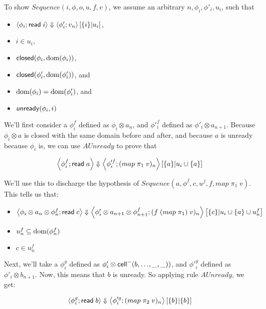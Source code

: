 \documentclass{article}
\begin{document}
To show $Sequence(i, \phi, o, u, f, v)$, we assume an arbitrary $n,
\phi_i, \phi'_i, u_i$, such that

\begin{itemize}
\item $\left<{\phi_i};{\mbox{\textsf{{read}}}\; i}\right>\Downarrow\left<{\phi'_i};{v_n}\right>\left[{\{{i}\}}|{u_i}\right]$, 
\item $i \in u_i$, 
\item $\mbox{\textsf{{closed}}}({\phi_i}, {\mbox{dom}({\phi_i})})$,
\item $\mbox{\textsf{{closed}}}({\phi'_i}, {\mbox{dom}({\phi'_i})})$, and
\item $\mbox{dom}({\phi_i}) = \mbox{dom}({\phi'_i})$, and
\item $\mbox{\textsf{{unready}}}({\phi_i}, {i})$
\end{itemize}

We'll first consider a $\phi^f_i$ defined as $\phi_i \otimes a_n$, and
$\phi'^f_i$ defined as $\phi'_i \otimes a_{n+1}$.  Because $\phi_i
\otimes a$ is closed with the same domain before and after, and
because $a$ is unready because $\phi_i$ is, we can use $AUnready$ to
prove that

\begin{displaymath}
  \left<{\phi^f_i};{\mbox{\textsf{{read}}}\; a}\right>\Downarrow\left<{\phi'^f_i};{(map\;\pi_1\;v)_n}\right>\left[{\{{a}\}}|{u_i \cup \{{a}\}}\right]
\end{displaymath}



We'll use this to discharge the hypothesis of $Sequence(a, \phi^f, c, u^f,
f, map\;\pi_1\;v)$. This tells us that:

\begin{itemize}
\item $\left<{\phi_i \otimes a_n \otimes \phi^f_n};{\mbox{\textsf{{read}}}\; c}\right>\Downarrow\left<{\phi'_i \otimes a_{n+1} \otimes \phi^f_{n+1}};{(f \;(map\;\pi_1)\;v)_n}\right>\left[{\{{c}\}}|{u_i \cup \{{a}\} \cup u^f_n}\right]$ 
\item $u^f_n \subseteq \mbox{dom}({\phi^f_n})$
\item $c \in u^f_n$
\end{itemize}

Next, we'll take a $\phi^g_i$ defined as $\phi'_i \otimes \mbox{\textsf{{cell}}}^{-}({b}, {\ldots}, {\_}, {\_}))$, and
$\phi'^g_i$ defined as $\phi'_i \otimes b_{n+1}$. Now, this means that 
$b$ is unready. So applying rule $AUnready$, we get: 

\begin{displaymath}
  \left<{\phi^g_i};{\mbox{\textsf{{read}}}\; b}\right>\Downarrow\left<{\phi'^g_i};{(map\;\pi_2\;v)_n}\right>\left[{\{{b}\}}|{\{{b}\}}\right]
\end{displaymath}
\end{document}
